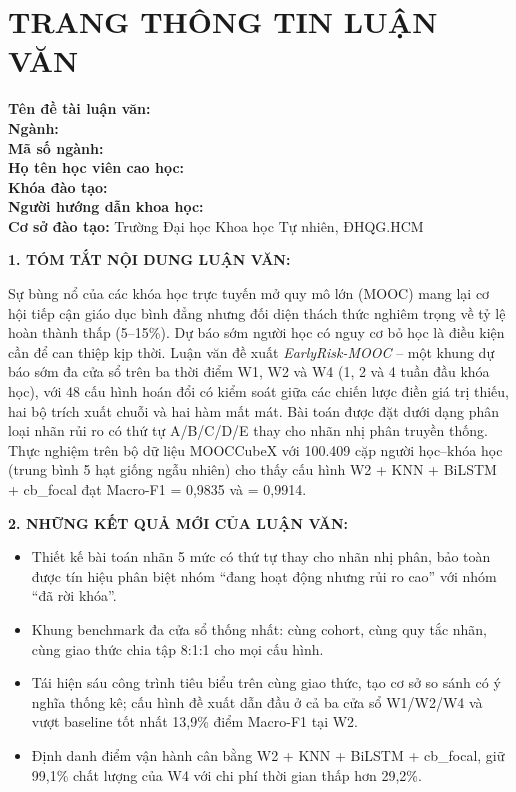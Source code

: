 \chapter*{TRANG THÔNG TIN LUẬN VĂN}

\begin{flushleft}
\textbf{Tên đề tài luận văn:} \thesistitleshort\\[3pt]
\textbf{Ngành:} \nganh\\[3pt]
\textbf{Mã số ngành:} \masonganh\\[3pt]
\textbf{Họ tên học viên cao học:} \hvchname\\[3pt]
\textbf{Khóa đào tạo:} \khoadaotao\\[3pt]
\textbf{Người hướng dẫn khoa học:} \cbhd\\[3pt]
\textbf{Cơ sở đào tạo:} Trường Đại học Khoa học Tự nhiên, ĐHQG.HCM
\end{flushleft}

\vspace{0.3cm}
\noindent\textbf{1. TÓM TẮT NỘI DUNG LUẬN VĂN:}

\noindent Sự bùng nổ của các khóa học trực tuyến mở quy mô lớn (MOOC) mang lại cơ hội tiếp cận giáo dục bình đẳng nhưng đối diện thách thức nghiêm trọng về tỷ lệ hoàn thành thấp (5--15\%). Dự báo sớm người học có nguy cơ bỏ học là điều kiện cần để can thiệp kịp thời. Luận văn đề xuất \textit{EarlyRisk-MOOC} -- một khung dự báo sớm đa cửa sổ trên ba thời điểm W1, W2 và W4 (1, 2 và 4 tuần đầu khóa học), với 48 cấu hình hoán đổi có kiểm soát giữa các chiến lược điền giá trị thiếu, hai bộ trích xuất chuỗi và hai hàm mất mát. Bài toán được đặt dưới dạng phân loại nhãn rủi ro có thứ tự A/B/C/D/E thay cho nhãn nhị phân truyền thống. Thực nghiệm trên bộ dữ liệu MOOCCubeX với 100.409 cặp người học--khóa học (trung bình 5 hạt giống ngẫu nhiên) cho thấy cấu hình W2 + KNN + BiLSTM + cb\_focal đạt Macro-F1 = 0,9835 và \FoneD{} = 0,9914.

\vspace{0.2cm}
\noindent\textbf{2. NHỮNG KẾT QUẢ MỚI CỦA LUẬN VĂN:}
\begin{itemize}[leftmargin=1.2cm,topsep=2pt,itemsep=1pt]
  \item Thiết kế bài toán nhãn 5 mức có thứ tự thay cho nhãn nhị phân, bảo toàn được tín hiệu phân biệt nhóm ``đang hoạt động nhưng rủi ro cao'' với nhóm ``đã rời khóa''.
  \item Khung benchmark đa cửa sổ thống nhất: cùng cohort, cùng quy tắc nhãn, cùng giao thức chia tập 8:1:1 cho mọi cấu hình.
  \item Tái hiện sáu công trình tiêu biểu trên cùng giao thức, tạo cơ sở so sánh có ý nghĩa thống kê; cấu hình đề xuất dẫn đầu ở cả ba cửa sổ W1/W2/W4 và vượt baseline tốt nhất 13,9\% điểm Macro-F1 tại W2.
  \item Định danh điểm vận hành cân bằng W2 + KNN + BiLSTM + cb\_focal, giữ 99,1\% chất lượng của W4 với chi phí thời gian thấp hơn 29,2\%.
\end{itemize}

